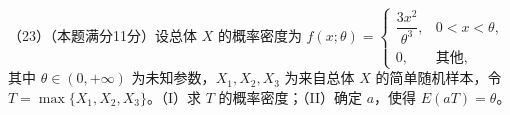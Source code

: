 \documentclass[UTF8,12pt]{ctexart}
\begin{document}
（23）（本题满分11分）设总体 \(\displaystyle X\) 的概率密度为 \(\displaystyle f(x;\theta)=\begin{cases}\dfrac{\displaystyle 3x^2}{\displaystyle \theta^3},\allowbreak &0<x<\theta,\allowbreak \\0,\allowbreak &\text{其他},\allowbreak \end{cases}\) 其中 \(\displaystyle \theta\in(0,\allowbreak +\infty)\) 为未知参数，\(\displaystyle X_1,\allowbreak X_2,\allowbreak X_3\) 为来自总体 \(\displaystyle X\) 的简单随机样本，令 \(\displaystyle T=\displaystyle \max\{X_1,\allowbreak X_2,\allowbreak X_3\}\)。（I）求 \(\displaystyle T\) 的概率密度；（II）确定 \(\displaystyle a\)，使得 \(\displaystyle E(aT)=\theta\)。


\clearpage
\end{document}
